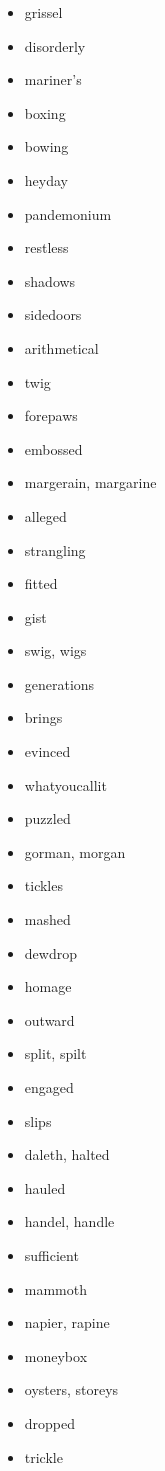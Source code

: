 \documentclass{article}
\begin{document}
\begin{itemize}
    \item grissel
    \item disorderly
    \item mariner's
    \item boxing
    \item bowing
    \item heyday
    \item pandemonium
    \item restless
    \item shadows
    \item sidedoors
    \item arithmetical
    \item twig
    \item forepaws
    \item embossed
    \item margerain, margarine
    \item alleged
    \item strangling
    \item fitted
    \item gist
    \item swig, wigs
    \item generations
    \item brings
    \item evinced
    \item whatyoucallit
    \item puzzled
    \item gorman, morgan
    \item tickles
    \item mashed
    \item dewdrop
    \item homage
    \item outward
    \item split, spilt
    \item engaged
    \item slips
    \item daleth, halted
    \item hauled
    \item handel, handle
    \item sufficient
    \item mammoth
    \item napier, rapine
    \item moneybox
    \item oysters, storeys
    \item dropped
    \item trickle

\end{itemize}
\end{document}
